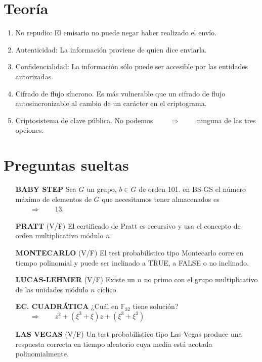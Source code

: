\documentclass[fleqn]{article}
\def\F{\mathds{F}}
\def\next{\qquad \Rightarrow \qquad}
\begin{document}
    \section{Teoría}
    \begin{enumerate}
        \item No repudio: El emisario no puede negar haber realizado el envío.
        \item Autenticidad: La información proviene de quien dice enviarla.
        \item Confidencialidad: La información sólo puede ser accesible por las entidades autorizadas.
        \item Cifrado de flujo síncrono. Es más vulnerable que un cifrado de flujo autosincronizable al cambio de un carácter en el criptograma.
        \item Criptosistema de clave pública. No podemos $\next$ ninguna de las tres opciones.
    \end{enumerate}

    \section{Preguntas sueltas}
    \begin{itemize}
        \item[\textbf{BABY STEP}] Sea $G$ un grupo, $b \in G$ de orden 101. en BS-GS el número máximo de elementos de $G$ que necesitamos tener almacenados es $\next 13$.
        \item[\textbf{PRATT}]  (V/F) El certificado de Pratt es recursivo y usa el concepto de orden multiplicativo módulo $n$.
        \item[\textbf{MONTECARLO}] (V/F) El test probabilístico tipo Montecarlo corre en tiempo polinomial y puede ser inclinado a TRUE, a FALSE o no inclinado.
        \item[\textbf{LUCAS-LEHMER}] (V/F) Existe un $n$ no primo con el grupo multiplicativo de las unidades módulo $n$ cíclico.
        \item[\textbf{EC. CUADRÁTICA}] ¿Cuál en $\F_{32}$ tiene solución? $\next z^2 + (\xi^3 + \xi)z + (\xi^3 + \xi^2)$ 
        \item[\textbf{LAS VEGAS}] (V/F) Un test probabilístico tipo Las Vegas produce una respuesta correcta en tiempo aleatorio cuya media está acotada polinomialmente.
    \end{itemize}
\end{document}
